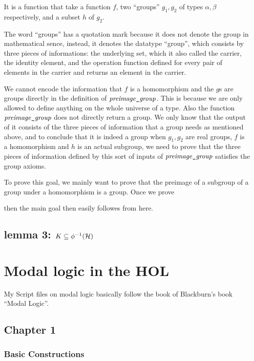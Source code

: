 \documentclass[letterpaper]{article}
\renewcommand{\HOLinline}[1]{\ensuremath{#1}}
\begin{document}
It is a function that take a function $f$, two ``groups'' $g_1,g_2$ of types $\alpha,\beta$ respectively, and a subset $h$ of $g_2$.

The word ``groups'' has a quotation mark because it does not denote the group in mathematical sence, instead, it denotes the datatype ``group'', which consists by three pieces of informations: the underlying set, which it also called the carrier, the identity element, and the operation function defined for every pair of elements in the carrier and returns an element in the carrier.

We cannot encode the information that $f$ is a homomorphism and the $g$s are groups directly in the definition of \HOLinline{\HOLFreeVar{preimage\HOLTokenUnderscore{}group}}. This is because we are only allowed to define anything on the whole universe of a type. Also the function \HOLinline{\HOLFreeVar{preimage\HOLTokenUnderscore{}group}} does not directly return a group. We only know that the output of it consists of the three pieces of information that a group needs as mentioned above, and to conclude that it is indeed a group when $g_1,g_2$ are real groups, $f$ is a homomorphism and $h$ is an actual subgroup, we need to prove that the three pieces of information defined by this sort of inputs of \HOLinline{\HOLFreeVar{preimage\HOLTokenUnderscore{}group}} satisfies the group axioms.

To prove this goal, we mainly want to prove that the preimage of a subgroup of a group under a homomorphism is a group. Once we prove

then the main goal then easily followes from here.

\subsection{lemma 3: $K\subseteq\phi^{-1}({\cal H})$}

\section{Modal logic in the HOL}

My Script files on modal logic basically follow the book of Blackburn's book ``Modal Logic''.

\subsection{Chapter 1}
\subsubsection{Basic Constructions}
\end{document}
